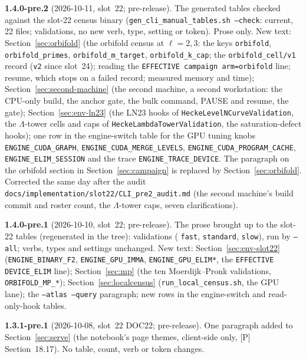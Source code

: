 \documentclass[11pt,openany]{report}
\newcommand{\cli}[1]{\texttt{#1}}
\newcommand{\file}[1]{\nolinkurl{#1}}
\begin{document}
\textbf{1.4.0-pre.2} (2026-10-11, slot~22; pre-release). The generated tables checked against the slot-22 census binary (\texttt{gen\_cli\_manual\_tables.sh --check}: current, 22 files; \CMNumValidations{} validations, no new verb, type, setting or token). Prose only. New text: Section~\ref{sec:orbifold} (the orbifold census at $\ell=2,3$: the keys \texttt{orbifold}, \texttt{orbifold\_primes}, \texttt{orbifold\_m\_target}, \texttt{orbifold\_k\_cap}; the \texttt{orbifold\_cell/v1} record (\texttt{v2} since slot~24); reading the \texttt{EFFECTIVE campaign arm=orbifold} line; resume, which stops on a failed record; measured memory and time); Section~\ref{sec:second-machine} (the second machine, a second workstation: the CPU-only build, the anchor gate, the bulk command, PAUSE and resume, the gate); Section~\ref{sec:env-ln23} (the LN23 hooks of \texttt{HeckeLevelNCurveValidation}, the $\Lambda$-tower cells and caps of \texttt{HeckeLambdaTowerValidation}, the saturation-defect hooks); one row in the engine-switch table for the GPU tuning knobs \texttt{ENGINE\_CUDA\_GRAPH}, \texttt{ENGINE\_CUDA\_MERGE\_LEVELS}, \texttt{ENGINE\_CUDA\_PROGRAM\_CACHE}, \texttt{ENGINE\_ELIM\_SESSION} and the trace \texttt{ENGINE\_TRACE\_DEVICE}. The paragraph on the orbifold section in Section~\ref{sec:campaign} is replaced by Section~\ref{sec:orbifold}. Corrected the same day after the audit \file{docs/implementation/slot22/CLI\_pre2\_audit.md} (the second machine's build commit and roster count, the $\Lambda$-tower caps, seven clarifications).

\textbf{1.4.0-pre.1} (2026-10-10, slot~22; pre-release). The prose brought up to the slot-22 tables (regenerated in the tree): \CMNumValidations{} validations (\CMNumFast{} \texttt{fast}, \CMNumStandard{} \texttt{standard}, \CMNumSlow{} \texttt{slow}), \CMNumAll{} run by \cli{--all}; verbs, types and settings unchanged. New text: Section~\ref{sec:env-slot22} (\texttt{ENGINE\_BINARY\_F2}, \texttt{ENGINE\_GPU\_IMMA}, \texttt{ENGINE\_GPU\_ELIM*}, the \texttt{EFFECTIVE DEVICE\_ELIM} line); Section~\ref{sec:mp} (the ten Moerdijk--Pronk validations, \texttt{ORBIFOLD\_MP\_*}); Section~\ref{sec:localcensus} (\texttt{run\_local\_census.sh}, the GPU lane); the \cli{--atlas --query} paragraph; new rows in the engine-switch and read-only-hook tables.

\textbf{1.3.1-pre.1} (2026-10-08, slot~22 DOC22; pre-release). One paragraph added to Section~\ref{sec:serve} (the notebook's page themes, client-side only, [P] Section~18.17). No table, count, verb or token changes.
\end{document}
